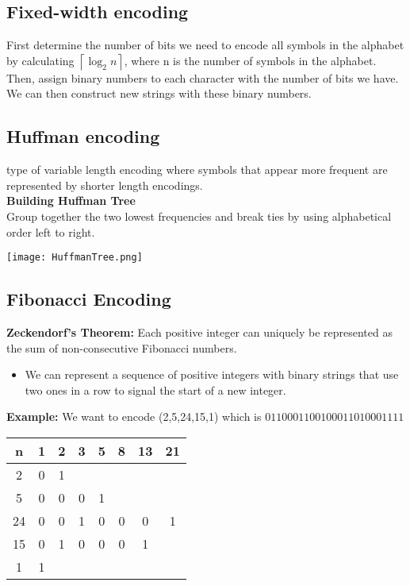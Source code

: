 \documentclass{article}
\begin{document}
\begin{spacing}{1.5}
\subsection{Fixed-width encoding}
First determine the number of bits we need to encode all symbols in the alphabet by calculating $ \left \lceil \log_2 n \right \rceil $, where n is the number of symbols in the alphabet. Then,  assign binary numbers to each character with the number of bits we have. We can then construct new strings with these binary numbers. \\
\label{sec:fwencode}
\newpage
\subsection{Huffman encoding}
\label{sec:huffman}
type of variable length encoding where symbols that appear more frequent are represented by shorter length encodings.\\
\textbf{Building Huffman Tree}\\
Group together the two lowest frequencies and break ties by using alphabetical order left to right.\\
\begin{center}
\texttt{[image: HuffmanTree.png]}\\
\end{center}
\subsection{Fibonacci Encoding}
\label{sec:fibencode}
\textbf{Zeckendorf's Theorem:} Each positive integer can uniquely be represented as the sum of non-consecutive Fibonacci numbers.
\begin{itemize}
    \item We can represent a sequence of positive integers with binary strings that use two ones in a row to signal the start of a new integer.\\
\end{itemize}
\textbf{Example:} We want to encode (2,5,24,15,1) which is $011 00011 00100011 0100011 11$\\
\begin{tabular}{c|c|c|c|c|c|c|c}
    n & 1 & 2 & 3 & 5 & 8 & 13 & 21 \\
    \hline
    2 & 0 & 1 & & & & &\\
    5 & 0 & 0 & 0 & 1 & & &\\
    24& 0 & 0 & 1 & 0 & 0 & 0 & 1\\
    15& 0 & 1 & 0 & 0 & 0 & 1 &\\
    1 & 1 & & & & & &\\
\end{tabular}
\newpage

\end{spacing}
\end{document}
